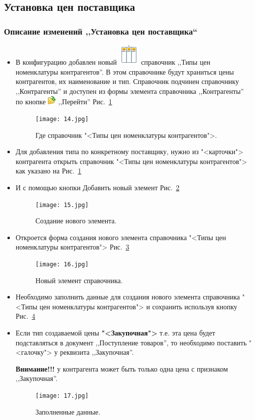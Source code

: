 \subsection{Установка цен поставщика}
\subsubsection{Описание изменений ,,Установка цен поставщика``}
\begin{itemize}	
	\item В конфигурацию добавлен новый   \includegraphics[width=0.02\linewidth]{images/sp} справочник ,,Типы цен номенклатуры контрагентов''. В этом справочнике будут храниться цены контрагентов, их наименование и тип. Справочник подчинен справочнику ,,Контрагенты'' и доступен из формы элемента справочника ,,Контрагенты'' по кнопке 	\includegraphics[width=0.02\linewidth]{images/mv} ,,Перейти''
    Рис.~\ref{ris:14.jpg}	
	\begin{figure}[H]
		\texttt{[image: 14.jpg]}
		\caption{Где справочник "<Типы цен номенклатуры контрагентов">.}
		\label{ris:14.jpg}
	\end{figure}
	\item Для добавления типа по конкретному поставщику, нужно из "<карточки"> контрагента открыть справочник "<Типы цен номенклатуры контрагентов"> как указано на Рис.~\ref{ris:14.jpg}
  	\item И с помощью кнопки   Добавить новый элемент
    Рис.~\ref{ris:15.jpg}	
  	\begin{figure}[H]
  		\texttt{[image: 15.jpg]}
  		\caption{Создание нового элемента.}
  		\label{ris:15.jpg}
  	\end{figure}
	\item Откроется форма создания нового элемента справочника "<Типы цен номенклатуры контрагентов"> Рис.~\ref{ris:16.jpg}
	\begin{figure}[H]
		\texttt{[image: 16.jpg]}
		\caption{Новый элемент справочника.}
		\label{ris:16.jpg}
	\end{figure}  
  
	\item Необходимо заполнить данные для создания нового элемента справочника "<Типы цен номенклатуры контрагентов"> и  сохранить используя кнопку   Рис.~\ref{ris:17.jpg}
	\item Если тип создаваемой цены \textbf{"<Закупочная">} т.е. эта цена будет подставляться в документ ,,Поступление товаров'', то необходимо поставить "<галочку"> у реквизита ,,Закупочная''. \par 
	\textbf{Внимание!!!} у контрагента может быть только одна цена с признаком ,,Закупочная''. 
  	\begin{figure}[H]
  		\texttt{[image: 17.jpg]}
  		\caption{Заполненные данные.}
  		\label{ris:17.jpg}
  	\end{figure}  
  

\end{itemize}
